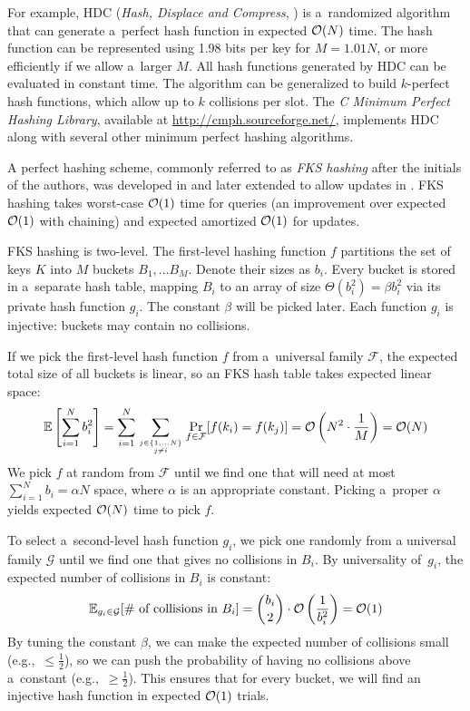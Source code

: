 For example, HDC (\textit{Hash, Displace and Compress},
\cite{hdc-hashing}) is a~randomized algorithm that can generate a~perfect
hash function in expected $\mathcal{O}(N)$ time. The hash function can be represented
using 1.98 bits per key for $M=1.01 N$, or more efficiently if we allow a~larger
$M$. All hash functions generated by HDC can be evaluated in constant time.
The algorithm can be generalized to build $k$-perfect hash functions, which
allow up to $k$ collisions per slot. The \textit{C Minimum Perfect
Hashing Library}, available at \url{http://cmph.sourceforge.net/}, implements
HDC along with several other minimum perfect hashing algorithms.

A perfect hashing scheme, commonly referred to as \emph{FKS hashing}
after the initials of the authors, was developed in \cite{fks-hashing}
and later extended to allow updates in \cite{dyn-ph-bounds}.
FKS hashing takes worst-case $\mathcal{O}(1)$ time for queries (an improvement over
expected $\mathcal{O}(1)$ with chaining) and expected amortized $\mathcal{O}(1)$ for updates.

FKS hashing is two-level. The first-level hashing function $f$ partitions
the set of keys $K$ into $M$ buckets $B_1,\ldots B_M$. Denote their sizes as
$b_i$.
Every bucket is stored in a~separate hash table, mapping $B_i$ to an array
of size $\Theta(b_i^2)=\beta b_i^2$ via its private hash function $g_i$.
The constant $\beta$ will be picked later.
Each function $g_i$ is injective: buckets may contain no collisions.

If we pick the first-level hash function $f$ from a~universal family
$\mathcal{F}$, the expected total size of all buckets is linear, so an FKS
hash table takes expected linear space:
$$\mathbb{E}\left[\sum_{i=1}^N b_i^2\right]=
	\sum_{i=1}^N \sum_{j\in\{1,\ldots N\} \atop j\neq i}
	\Pr_{f\in\mathcal{F}}[f(k_i)=f(k_j)]=
	\mathcal{O}\left(N^2\cdot\frac{1}{M}\right)=\mathcal{O}(N)$$
We pick $f$ at random from $\mathcal{F}$ until we find one that will need at
most $\sum_{i=1}^N b_i=\alpha N$ space, where $\alpha$ is an appropriate
constant. Picking a~proper $\alpha$ yields expected $\mathcal{O}(N)$ time to pick $f$.

To select a~second-level hash function $g_i$, we pick one randomly from
a universal family $\mathcal{G}$ until we find one that gives no collisions
in $B_i$. By universality of~$g_i$, the expected number of collisions in $B_i$
is constant:
$$\mathbb{E}_{g_i\in\mathcal{G}}[\text{\# of collisions in }B_i]=
	{b_i\choose 2}\cdot\mathcal{O}\left(\frac{1}{b_i^2}\right)=\mathcal{O}(1)$$
By tuning the constant $\beta$, we can make the expected number of collisions
small (e.g.,\ $\leq\frac{1}{2}$), so we can push the probability of having no
collisions above a~constant (e.g.,\ $\geq\frac{1}{2}$). This ensures that for
every bucket, we will find an injective hash function in expected $\mathcal{O}(1)$
trials.

